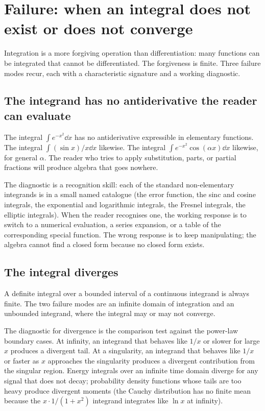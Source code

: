 \section{Failure: when an integral does not exist or does not
converge}

Integration is a more forgiving operation than differentiation:
many functions can be integrated that cannot be differentiated. The
forgiveness is finite. Three failure modes recur, each with a
characteristic signature and a working diagnostic.

\subsection{The integrand has no antiderivative the reader can
evaluate}

The integral $\int e^{-x^{2}} \dd x$ has no antiderivative
expressible in elementary functions. The integral $\int (\sin
x)/x \dd x$ likewise. The integral $\int e^{-x^{2}} \cos(\alpha x)
\dd x$ likewise, for general $\alpha$. The reader who tries to
apply substitution, parts, or partial fractions will produce
algebra that goes nowhere.

The diagnostic is a recognition skill: each of the standard
non-elementary integrands is in a small named catalogue (the error
function, the sinc and cosine integrals, the exponential and
logarithmic integrals, the Fresnel integrals, the elliptic
integrals). When the reader recognises one, the working response is
to switch to a numerical evaluation, a series expansion, or a table
of the corresponding special function. The wrong response is to
keep manipulating; the algebra cannot find a closed form because
no closed form exists.

\subsection{The integral diverges}

A definite integral over a bounded interval of a continuous
integrand is always finite. The two failure modes are an infinite
domain of integration and an unbounded integrand, where the
integral may or may not converge.

The diagnostic for divergence is the comparison test against the
power-law boundary cases. At infinity, an integrand that behaves
like $1/x$ or slower for large $x$ produces a divergent tail. At a
singularity, an integrand that behaves like $1/x$ or faster as $x$
approaches the singularity produces a divergent contribution from
the singular region. Energy integrals over an infinite time domain
diverge for any signal that does not decay; probability density
functions whose tails are too heavy produce divergent moments
(the Cauchy distribution has no finite mean because the
$x \cdot 1/(1 + x^{2})$ integrand integrates like $\ln x$ at
infinity).

